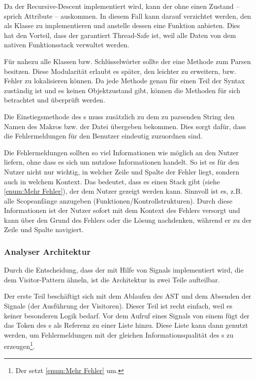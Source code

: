       Da der  Recursive-Descent implementiert wird, kann der  ohne einen Zustand -- sprich Attribute -- auskommen. In diesem Fall kann darauf verzichtet werden, den  als Klasse zu implementieren und anstelle dessen eine  Funktion anbieten. Dies hat den Vorteil, dass der  garantiert Thread-Safe ist, weil alle Daten von dem nativen Funktionsstack verwaltet werden.

      Für nahezu alle  Klassen bzw. Schlüsselwörter sollte der  eine Methode zum Parsen besitzen. Diese Modularität erlaubt es später, den  leichter zu erweitern, bzw. Fehler zu lokalisieren können. Da jede Methode genau für einen Teil der Syntax zuständig ist und es keinen Objektzustand gibt, können die Methoden für sich betrachtet und überprüft werden.

      Die Einstiegsmethode des s muss zusätzlich zu dem zu parsenden String den Namen des Makros bzw. der Datei übergeben bekommen. Dies sorgt dafür, dass die Fehlermeldungen für den Benutzer eindeutig zuzuordnen sind.

      Die Fehlermeldungen sollten so viel Informationen wie möglich an den Nutzer liefern, ohne dass es sich um nutzlose Informationen handelt. So ist es für den Nutzer nicht nur wichtig, in welcher Zeile und Spalte der Fehler liegt, sondern auch in welchem Kontext. Das bedeutet, dass es einen Stack gibt (siehe \ref{enum:Mehr Fehler}), der dem Nutzer gezeigt werden kann. Sinnvoll ist es, z.B. alle Scopeanfänge anzugeben (Funktionen/Kontrollstrukturen). Durch diese Informationen ist der Nutzer sofort mit dem Kontext des Fehlers versorgt und kann über den Grund des Fehlers oder die Lösung  nachdenken, während er zu der Zeile und Spalte navigiert.

    \subsubsection{Analyser Architektur}
    \label{sssec:Analyser Architektur}
      Durch die Entscheidung, dass der  mit Hilfe von Signals implementiert wird, die dem Visitor-Pattern ähneln, ist die Architektur in zwei Teile aufteilbar.

      Der erste Teil beschäftigt sich mit dem Ablaufen des AST und dem Absenden der Signale (der Ausführung der Visitoren). Dieser Teil ist recht einfach, weil es keiner besonderen Logik bedarf. Vor dem Aufruf eines Signals von einem  fügt der  das Token des s als Referenz zu einer Liste hinzu. Diese Liste kann dann genutzt werden, um Fehlermeldungen mit der gleichen Informationsqualität des s zu erzeugen\footnote{
        Der  setzt \ref{enum:Mehr Fehler} um.
      }.

